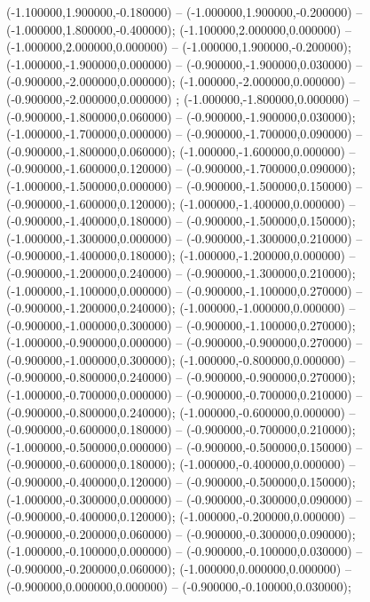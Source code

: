  (-1.100000,1.900000,-0.180000) -- (-1.000000,1.900000,-0.200000) -- (-1.000000,1.800000,-0.400000);
 (-1.100000,2.000000,0.000000) -- (-1.000000,2.000000,0.000000) -- (-1.000000,1.900000,-0.200000);
 (-1.000000,-1.900000,0.000000) -- (-0.900000,-1.900000,0.030000) -- (-0.900000,-2.000000,0.000000);
 (-1.000000,-2.000000,0.000000) -- (-0.900000,-2.000000,0.000000) ;
 (-1.000000,-1.800000,0.000000) -- (-0.900000,-1.800000,0.060000) -- (-0.900000,-1.900000,0.030000);
 (-1.000000,-1.700000,0.000000) -- (-0.900000,-1.700000,0.090000) -- (-0.900000,-1.800000,0.060000);
 (-1.000000,-1.600000,0.000000) -- (-0.900000,-1.600000,0.120000) -- (-0.900000,-1.700000,0.090000);
 (-1.000000,-1.500000,0.000000) -- (-0.900000,-1.500000,0.150000) -- (-0.900000,-1.600000,0.120000);
 (-1.000000,-1.400000,0.000000) -- (-0.900000,-1.400000,0.180000) -- (-0.900000,-1.500000,0.150000);
 (-1.000000,-1.300000,0.000000) -- (-0.900000,-1.300000,0.210000) -- (-0.900000,-1.400000,0.180000);
 (-1.000000,-1.200000,0.000000) -- (-0.900000,-1.200000,0.240000) -- (-0.900000,-1.300000,0.210000);
 (-1.000000,-1.100000,0.000000) -- (-0.900000,-1.100000,0.270000) -- (-0.900000,-1.200000,0.240000);
 (-1.000000,-1.000000,0.000000) -- (-0.900000,-1.000000,0.300000) -- (-0.900000,-1.100000,0.270000);
 (-1.000000,-0.900000,0.000000) -- (-0.900000,-0.900000,0.270000) -- (-0.900000,-1.000000,0.300000);
 (-1.000000,-0.800000,0.000000) -- (-0.900000,-0.800000,0.240000) -- (-0.900000,-0.900000,0.270000);
 (-1.000000,-0.700000,0.000000) -- (-0.900000,-0.700000,0.210000) -- (-0.900000,-0.800000,0.240000);
 (-1.000000,-0.600000,0.000000) -- (-0.900000,-0.600000,0.180000) -- (-0.900000,-0.700000,0.210000);
 (-1.000000,-0.500000,0.000000) -- (-0.900000,-0.500000,0.150000) -- (-0.900000,-0.600000,0.180000);
 (-1.000000,-0.400000,0.000000) -- (-0.900000,-0.400000,0.120000) -- (-0.900000,-0.500000,0.150000);
 (-1.000000,-0.300000,0.000000) -- (-0.900000,-0.300000,0.090000) -- (-0.900000,-0.400000,0.120000);
 (-1.000000,-0.200000,0.000000) -- (-0.900000,-0.200000,0.060000) -- (-0.900000,-0.300000,0.090000);
 (-1.000000,-0.100000,0.000000) -- (-0.900000,-0.100000,0.030000) -- (-0.900000,-0.200000,0.060000);
 (-1.000000,0.000000,0.000000) -- (-0.900000,0.000000,0.000000) -- (-0.900000,-0.100000,0.030000);
